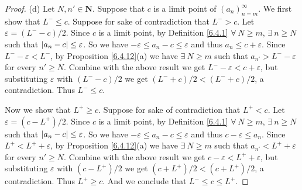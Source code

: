\begin{proof}{(d)}
    Let \(N, n' \in \mathbf{N}\).
    Suppose that \(c\) is a limit point of \((a_n)_{n = m}^\infty\).
    We first show that \(L^- \leq c\).
    Suppose for sake of contradiction that \(L^- > c\).
    Let \(\varepsilon = (L^- - c) / 2\).
    Since \(c\) is a limit point, by Definition \ref{6.4.1} \(\forall\ N \geq m\), \(\exists\ n \geq N\) such that \(\abs*{a_n - c} \leq \varepsilon\).
    So we have \(-\varepsilon \leq a_n - c \leq \varepsilon\) and thus \(a_n \leq c + \varepsilon\).
    Since \(L^- - \varepsilon < L^-\), by Proposition \ref{6.4.12}(a) we have \(\exists\ N \geq m\) such that \(a_{n'} > L^- - \varepsilon\) for every \(n' \geq N\).
    Combine with the above result we get \(L^- - \varepsilon < c + \varepsilon\), but substituting \(\varepsilon\) with \((L^- - c) / 2\) we get \((L^- + c) / 2 < (L^- + c) / 2\), a contradiction.
    Thus \(L^- \leq c\).

    Now we show that \(L^+ \geq c\).
    Suppose for sake of contradiction that \(L^+ < c\).
    Let \(\varepsilon = (c - L^+) / 2\).
    Since \(c\) is a limit point, by Definition \ref{6.4.1} \(\forall\ N \geq m\), \(\exists\ n \geq N\) such that \(\abs*{a_n - c} \leq \varepsilon\).
    So we have \(-\varepsilon \leq a_n - c \leq \varepsilon\) and thus \(c - \varepsilon \leq a_n\).
    Since \(L^+ < L^+ + \varepsilon\), by Proposition \ref{6.4.12}(a) we have \(\exists\ N \geq m\) such that \(a_{n'} < L^+ + \varepsilon\) for every \(n' \geq N\).
    Combine with the above result we get \(c - \varepsilon < L^+ + \varepsilon\), but substituting \(\varepsilon\) with \((c - L^+) / 2\) we get \((c + L^+) / 2 < (c + L^+) / 2\), a contradiction.
    Thus \(L^+ \geq c\).
    And we conclude that \(L^- \leq c \leq L^+\).
\end{proof}

